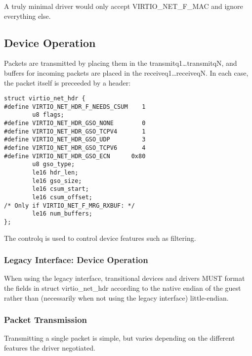 A truly minimal driver would only accept VIRTIO_NET_F_MAC and ignore
everything else.

\subsection{Device Operation}\label{sec:Device Types / Network Device / Device Operation}

Packets are transmitted by placing them in the
transmitq1\ldots transmitqN, and buffers for incoming packets are
placed in the receiveq1\ldots receiveqN. In each case, the packet
itself is preceeded by a header:

\begin{lstlisting}
struct virtio_net_hdr {
#define VIRTIO_NET_HDR_F_NEEDS_CSUM    1
        u8 flags;
#define VIRTIO_NET_HDR_GSO_NONE        0
#define VIRTIO_NET_HDR_GSO_TCPV4       1
#define VIRTIO_NET_HDR_GSO_UDP         3
#define VIRTIO_NET_HDR_GSO_TCPV6       4
#define VIRTIO_NET_HDR_GSO_ECN      0x80
        u8 gso_type;
        le16 hdr_len;
        le16 gso_size;
        le16 csum_start;
        le16 csum_offset;
/* Only if VIRTIO_NET_F_MRG_RXBUF: */
        le16 num_buffers;
};
\end{lstlisting}

The controlq is used to control device features such as
filtering.

\subsubsection{Legacy Interface: Device Operation}\label{sec:Device Types / Network Device / Device Operation / Legacy Interface: Device Operation}
When using the legacy interface, transitional devices and drivers
MUST format the fields in struct virtio_net_hdr
according to the native endian of the guest rather than
(necessarily when not using the legacy interface) little-endian.

\subsubsection{Packet Transmission}\label{sec:Device Types / Network Device / Device Operation / Packet Transmission}

Transmitting a single packet is simple, but varies depending on
the different features the driver negotiated.

